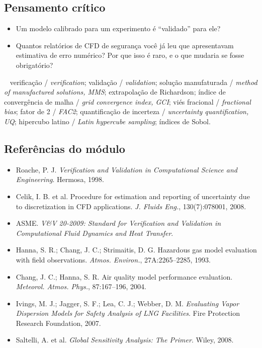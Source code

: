 \documentclass[10pt,a4paper,twocolumn,openany]{report}
\newcommand{\lead}[2]{\par\medskip\noindent{\color{#1}\bfseries #2}\ }
\newenvironment{critico}{\subsection*{\textcolor{roxo}{Pensamento crítico}}}{\par}
\newenvironment{chaves}{\lead{cinza}{Palavras-chave (PT/EN):}\small}{\par}
\newenvironment{refs}{\subsection*{Referências do módulo}\small}{\par}
\begin{document}
\begin{critico}
\begin{itemize}
  \item Um modelo calibrado para um experimento é ``validado'' para ele?
  \item Quantos relatórios de CFD de segurança você já leu que apresentavam
        estimativa de erro numérico? Por que isso é raro, e o que mudaria se
        fosse obrigatório?
\end{itemize}
\end{critico}

\begin{chaves}
verificação / \emph{verification}; validação / \emph{validation};
solução manufaturada / \emph{method of manufactured solutions, MMS};
extrapolação de Richardson; índice de convergência de malha / \emph{grid
convergence index, GCI}; viés fracional / \emph{fractional bias}; fator de 2
/ \emph{FAC2}; quantificação de incerteza / \emph{uncertainty quantification,
UQ}; hipercubo latino / \emph{Latin hypercube sampling}; índices de Sobol.
\end{chaves}

\begin{refs}
\begin{itemize}
  \item Roache, P. J. \emph{Verification and Validation in Computational Science and Engineering}. Hermosa, 1998.
  \item Celik, I. B. et al. Procedure for estimation and reporting of uncertainty due to discretization in CFD applications. \emph{J. Fluids Eng.}, 130(7):078001, 2008.
  \item ASME. \emph{V\&V 20-2009: Standard for Verification and Validation in Computational Fluid Dynamics and Heat Transfer}.
  \item Hanna, S. R.; Chang, J. C.; Strimaitis, D. G. Hazardous gas model evaluation with field observations. \emph{Atmos. Environ.}, 27A:2265--2285, 1993.
  \item Chang, J. C.; Hanna, S. R. Air quality model performance evaluation. \emph{Meteorol. Atmos. Phys.}, 87:167--196, 2004.
  \item Ivings, M. J.; Jagger, S. F.; Lea, C. J.; Webber, D. M. \emph{Evaluating Vapor Dispersion Models for Safety Analysis of LNG Facilities}. Fire Protection Research Foundation, 2007.
  \item Saltelli, A. et al. \emph{Global Sensitivity Analysis: The Primer}. Wiley, 2008.
\end{itemize}
\end{refs}
\end{document}
